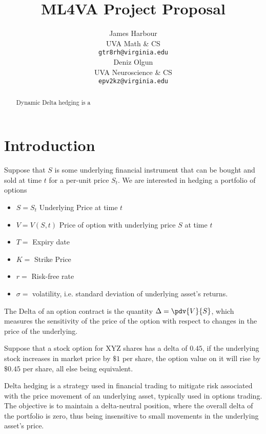 \documentclass{article}
\title{ML4VA Project Proposal}
\author{
  James Harbour \\
  UVA Math \& CS \\
  \texttt{gtr8rh@virginia.edu} \\
   \And
  Deniz Olgun \\
  UVA Neuroscience \& CS \\
  \texttt{epv2kz@virginia.edu} \\
}
\begin{document}
\maketitle
\begin{abstract}
  Dynamic Delta hedging is a \cite{deephedge}

\end{abstract}

\tableofcontents



\section{Introduction}


Suppose that $ S $ is some underlying financial instrument that can be bought and sold at time $ t $ for a per-unit price $ S_{t} $. We are interested in hedging a portfolio of options 

\begin{itemize}
		\item $S = S_{t}$ Underlying Price at time $t$
		\item $ V = V(S, t) $ Price of option with underlying price $ S $ at time $ t $
		\item $T = $ Expiry date  
		\item $K = $ Strike Price
		\item $r = $ Risk-free rate	
		\item $ \sigma = $ volatility, i.e. standard deviation of underlying asset's returns.
	\end{itemize}	


\begin{definition}[Delta]
	The Delta of an option contract is the quantity $ \Delta = \pdv{V}{S} $, which measures the sensitivity of the price of the option with respect to changes in the price of the underlying.
\end{definition}
	
Suppose that a stock option for XYZ shares has a delta of $0.45$, if the underlying stock increases in market price by $\$1$ per share, the option value on it will rise by $\$0.45$ per share, all else being equivalent. 



\begin{definition}
	Delta hedging is a strategy used in financial trading to mitigate risk associated with the price movement of an underlying asset, typically used in options trading. The objective is to maintain a delta-neutral position, where the overall delta of the portfolio is zero, thus being insensitive to small movements in the underlying asset's price.
\end{definition}
\end{document}
